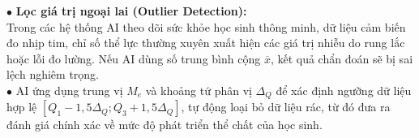 \documentclass[12pt, a4paper]{article}
\begin{document}
\begin{aibox}
    $\bullet$ \textbf{Lọc giá trị ngoại lai (Outlier Detection):}\\
    Trong các hệ thống AI theo dõi sức khỏe học sinh thông minh, dữ liệu cảm biến đo nhịp tim, chỉ số thể lực thường xuyên xuất hiện các giá trị nhiễu do rung lắc hoặc lỗi đo lường. Nếu AI dùng số trung bình cộng $\overline{x}$, kết quả chẩn đoán sẽ bị sai lệch nghiêm trọng.\\
    $\bullet$ AI ứng dụng trung vị $M_e$ và khoảng tứ phân vị $\Delta_Q$ để xác định ngưỡng dữ liệu hợp lệ $[Q_1 - 1{,}5\Delta_Q; Q_3 + 1{,}5\Delta_Q]$, tự động loại bỏ dữ liệu rác, từ đó đưa ra đánh giá chính xác về mức độ phát triển thể chất của học sinh.
\end{aibox}
\end{document}
